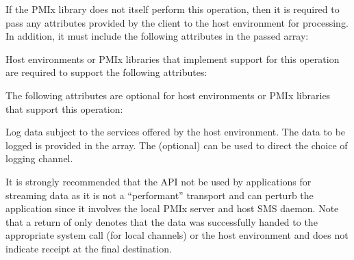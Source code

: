 \returnsimple

\reqattrstart
If the \ac{PMIx} library does not itself perform this operation, then it is required to pass any attributes provided by the client to the host environment for processing. In addition, it must include the following attributes in the passed  array:


Host environments or \ac{PMIx} libraries that implement support for this operation are required to support the following attributes:


\reqattrend

\optattrstart
The following attributes are optional for host environments or \ac{PMIx} libraries that support this operation:


\optattrend

\descr

Log data subject to the services offered by the host environment. The data to be logged is provided in the  array. The (optional)  can be used to direct the choice of logging channel.

\adviceuserstart
It is strongly recommended that the  API not be used by applications for streaming data as it is not a ``performant'' transport and can perturb the application since it involves the local \ac{PMIx} server and host \ac{SMS} daemon. Note that a return of  only denotes that the data was successfully handed to the appropriate system call (for local channels) or the host environment and does not indicate receipt at the final destination.
\adviceuserend


